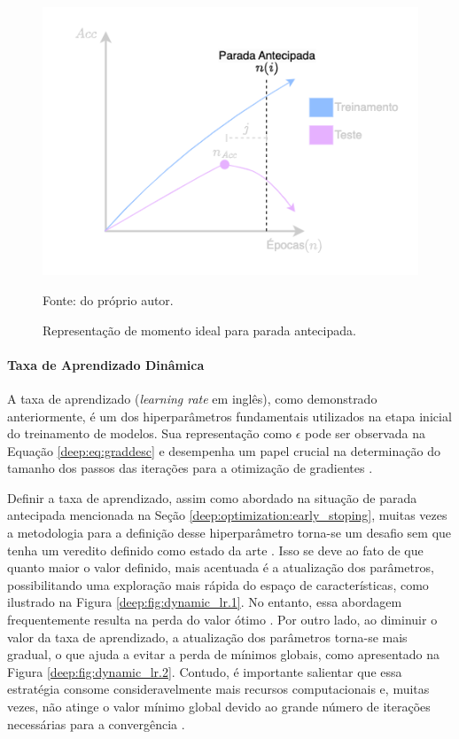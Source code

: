 \begin{figure}[H]
    \centering
    \caption{Representação de momento ideal para parada antecipada.}
    \includegraphics[width=0.6\linewidth]{recursos/imagens/deep/early_stopping.png}
    \label{deep:fig:earlystopping}

    Fonte: do próprio autor.
\end{figure}

\paragraph{Taxa de Aprendizado Dinâmica}
\label{deep:optimization:dynamic_lr}

A taxa de aprendizado (\textit{learning rate} em inglês), como demonstrado anteriormente, é um dos hiperparâmetros fundamentais utilizados na etapa inicial do treinamento de modelos. Sua representação como $\epsilon$ pode ser observada na Equação \ref{deep:eq:graddesc} e desempenha um papel crucial na determinação do tamanho dos passos das iterações para a otimização de gradientes \citep{Smith2017CyclicalNetworks}.

Definir a taxa de aprendizado, assim como abordado na situação de parada antecipada mencionada na Seção \ref{deep:optimization:early_stoping}, muitas vezes a metodologia para a definição desse hiperparâmetro torna-se um desafio sem que tenha um veredito definido como estado da arte \citep{Goodfellow2016}. Isso se deve ao fato de que quanto maior o valor definido, mais acentuada é a atualização dos parâmetros, possibilitando uma exploração mais rápida do espaço de características, como ilustrado na Figura \ref{deep:fig:dynamic_lr.1}. No entanto, essa abordagem frequentemente resulta na perda do valor ótimo \citep{Tang2021AnPump}. Por outro lado, ao diminuir o valor da taxa de aprendizado, a atualização dos parâmetros torna-se mais gradual, o que ajuda a evitar a perda de mínimos globais, como apresentado na Figura \ref{deep:fig:dynamic_lr.2}. Contudo, é importante salientar que essa estratégia consome consideravelmente mais recursos computacionais e, muitas vezes, não atinge o valor mínimo global devido ao grande número de iterações necessárias para a convergência \citep{Tang2021AnPump}.

